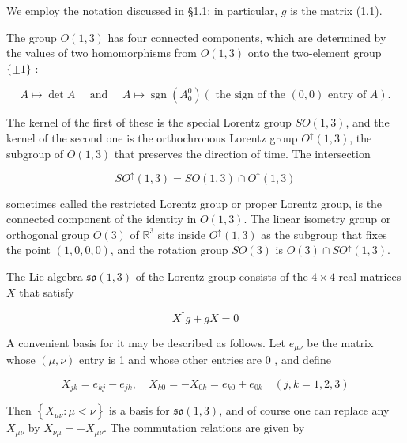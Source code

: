 \documentclass[10pt, letterpaper]{article}
\begin{document}
We employ the notation discussed in §1.1; in particular, $g$ is the matrix (1.1).

The group $O(1,3)$ has four connected components, which are determined by the values of two homomorphisms from $O(1,3)$ onto the two-element group $\{ \pm 1\}$ :

$$
A \mapsto \operatorname{det} A \quad \text { and } \quad A \mapsto \operatorname{sgn}\left(A_{0}^{0}\right)(\text { the sign of the }(0,0) \text { entry of } A) .
$$

The kernel of the first of these is the special Lorentz group $S O(1,3)$, and the kernel of the second one is the orthochronous Lorentz group $O^{\uparrow}(1,3)$, the subgroup of $O(1,3)$ that preserves the direction of time. The intersection

$$
S O^{\uparrow}(1,3)=S O(1,3) \cap O^{\uparrow}(1,3)
$$

sometimes called the restricted Lorentz group or proper Lorentz group, is the connected component of the identity in $O(1,3)$. The linear isometry group or orthogonal group $O(3)$ of $\mathbb{R}^{3}$ sits inside $O^{\uparrow}(1,3)$ as the subgroup that fixes the point $(1,0,0,0)$, and the rotation group $S O(3)$ is $O(3) \cap S O^{\uparrow}(1,3)$.

The Lie algebra $\mathfrak{s} \mathfrak{o}(1,3)$ of the Lorentz group consists of the $4 \times 4$ real matrices $X$ that satisfy

$$
X^{\dagger} g+g X=0
$$

A convenient basis for it may be described as follows. Let $e_{\mu \nu}$ be the matrix whose $(\mu, \nu)$ entry is 1 and whose other entries are 0 , and define

$$
X_{j k}=e_{k j}-e_{j k}, \quad X_{k 0}=-X_{0 k}=e_{k 0}+e_{0 k} \quad(j, k=1,2,3)
$$

Then $\left\{X_{\mu \nu}: \mu<\nu\right\}$ is a basis for $\mathfrak{s} \mathfrak{o}(1,3)$, and of course one can replace any $X_{\mu \nu}$ by $X_{\nu \mu}=-X_{\mu \nu}$. The commutation relations are given by
\end{document}
